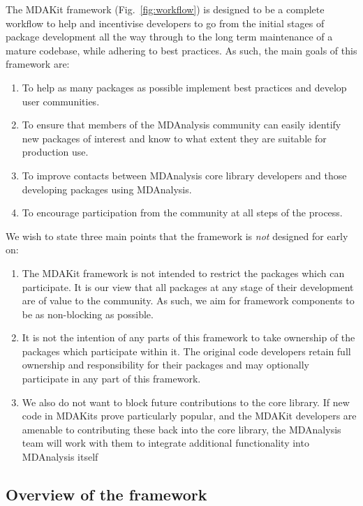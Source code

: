 \documentclass[9pt,whitepaper]{livecoms}
\begin{document}
The MDAKit framework (Fig.~\ref{fig:workflow}) is designed to be a complete workflow to help and incentivise developers to go from the initial stages of package development all the way through to the long term maintenance of a mature codebase, while adhering to best practices. As such, the main goals of this framework are:
\begin{enumerate}
    \item To help as many packages as possible implement best practices and develop user communities.
    \item To ensure that members of the MDAnalysis community can easily identify new packages of interest and know to what extent they are suitable for production use.
    \item To improve contacts between MDAnalysis core library developers and those developing packages using MDAnalysis.
    \item To encourage participation from the community at all steps of the process.
\end{enumerate}
We wish to state three main points that the framework is \emph{not} designed for early on:
\begin{enumerate}
    \item The MDAKit framework is not intended to restrict the packages which can participate. It is our view that all packages at any stage of their development are of value to the community. As such, we aim for framework components to be as non-blocking as possible.
    \item It is not the intention of any parts of this framework to take ownership of the packages which participate within it. The original code developers retain full ownership and responsibility for their packages and may optionally participate in any part of this framework.
    \item We also do not want to block future contributions to the core library. If new code in MDAKits prove particularly popular, and the MDAKit developers are amenable to contributing these back into the core library, the MDAnalysis team will work with them to integrate additional functionality into MDAnalysis itself
\end{enumerate}

\subsection{Overview of the framework}
\label{sec:overviewframework}
\end{document}
